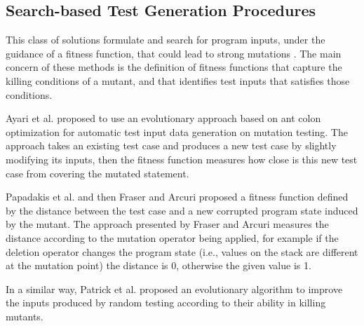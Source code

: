 \subsection{Search-based Test Generation Procedures}

This class of solutions formulate and search for program inputs, under the guidance of a fitness function, that could lead to strong mutations \cite{harman2011strong}. 
The main concern of these methods is the definition of fitness functions that capture the killing conditions of a mutant, and that identifies test inputs that satisfies those conditions.

Ayari et al. \cite{ayari2007automatic} proposed to use an evolutionary approach based on ant colon optimization for automatic test input data generation on mutation testing. The approach takes an existing test case and produces a new test case by slightly modifying its inputs, then the fitness function measures how close is this new test case from covering the mutated statement.

Papadakis et al. \cite{papadakis2011automatically} and then Fraser and Arcuri \cite{fraser2015achieving} proposed a fitness function defined by the distance between the test case and a new corrupted program state induced by the mutant. The approach presented by Fraser and Arcuri \cite{fraser2015achieving} measures the distance according to the mutation operator being applied, for example if the deletion operator changes the program state (i.e., values on the stack are different at the mutation point) the distance is 0, otherwise the given value is 1.

In a similar way, Patrick et al. \cite{patrick2013using} proposed an evolutionary algorithm to improve the inputs produced by random testing according to their ability in killing mutants. 

\endinput

\subsubsection{Symbolic execution test generation} %

\begin{itemize}

	\item Dynamic symbolic execution approaches: embed the mutant killing conditions within the executable program and guide test generation towards these conditions.

	\item Papadakis et al. \cite{papadakis2011automatically, papadakis2010towards}:
	Embed mutant infection conditions (cause a corruption to the program state) within the schematic functions that are produced by mutant schemata. Basically, we have all mutants encoded in a single executable with their killing conditions. Then, using dynamic symbolic execution we can directly produce test cases that targets those infection conditions.
\end{itemize}


